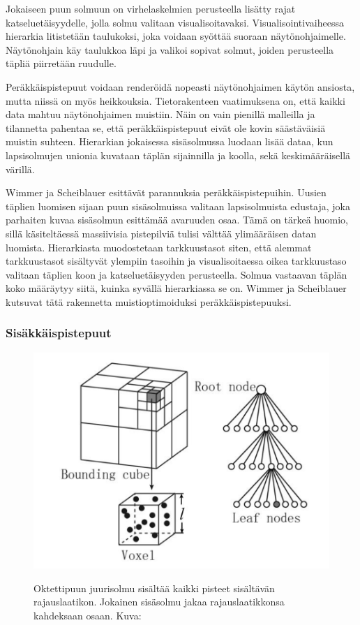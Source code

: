Jokaiseen puun solmuun on virhelaskelmien perusteella lisätty rajat katseluetäisyydelle, jolla solmu valitaan visualisoitavaksi. Visualisointivaiheessa hierarkia litistetään taulukoksi, joka voidaan syöttää suoraan näytönohjaimelle. Näytönohjain käy taulukkoa läpi ja valikoi sopivat solmut, joiden perusteella täpliä piirretään ruudulle. \cite{spt}

Peräkkäispistepuut voidaan renderöidä nopeasti näytönohjaimen käytön ansiosta, mutta niissä on myös heikkouksia. Tietorakenteen vaatimuksena on, että kaikki data mahtuu näytönohjaimen muistiin. Näin on vain pienillä malleilla ja tilannetta pahentaa se, että peräkkäispistepuut eivät ole kovin säästäväisiä muistin suhteen. Hierarkian jokaisessa sisäsolmussa luodaan lisää dataa, kun lapsisolmujen unionia kuvataan täplän sijainnilla ja koolla, sekä keskimääräisellä värillä.

Wimmer ja Scheiblauer esittävät parannuksia peräkkäispistepuihin. Uusien täplien luomisen sijaan puun sisäsolmuissa valitaan lapsisolmuista edustaja, joka parhaiten kuvaa sisäsolmun esittämää avaruuden osaa. Tämä on tärkeä huomio, sillä käsiteltäessä massiivisia pistepilviä tulisi välttää ylimääräisen datan luomista. Hierarkiasta muodostetaan tarkkuustasot siten, että alemmat tarkkuustasot sisältyvät ylempiin tasoihin ja visualisoitaessa oikea tarkkuustaso valitaan täplien koon ja katseluetäisyyden perusteella. Solmua vastaavan täplän koko määräytyy siitä, kuinka syvällä hierarkiassa se on. Wimmer ja Scheiblauer kutsuvat tätä rakennetta muistioptimoiduksi peräkkäispistepuuksi.  \cite{ip} %


\subsubsection{Sisäkkäispistepuut}
\begin{figure}
    \centering
    \includegraphics[width=0.5\paperwidth]{img/octree.png}
    \label{octree}
    \caption{Oktettipuun juurisolmu sisältää kaikki pisteet sisältävän rajauslaatikon. Jokainen sisäsolmu jakaa rajauslaatikkonsa kahdeksaan osaan. Kuva: \cite{octreekuva}}
\end{figure}

